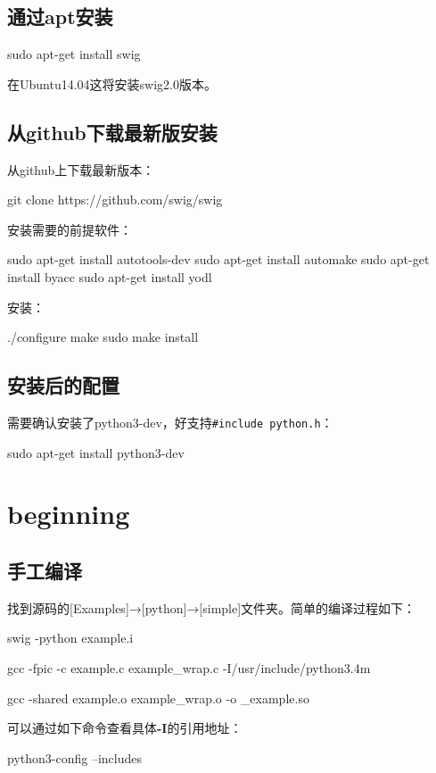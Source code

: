 \documentclass[12pt,oneside]{book}
\begin{document}
\begin{common-format}
\subsection{通过apt安装}
\begin{tcbbash}[]
sudo apt-get install swig
\end{tcbbash}

在Ubuntu14.04这将安装swig2.0版本。

\subsection{从github下载最新版安装}
从github上下载最新版本：
\begin{tcbbash}[]
git  clone  https://github.com/swig/swig
\end{tcbbash}

安装需要的前提软件：
\begin{tcbbash}[]
sudo apt-get install autotools-dev
sudo apt-get install automake
sudo apt-get install byacc
sudo apt-get install yodl
\end{tcbbash}

安装：
\begin{tcbbash}[]
./configure
make
sudo make install
\end{tcbbash}

\subsection{安装后的配置}
需要确认安装了python3-dev，好支持\verb+#include python.h+：
\begin{tcbbash}[]
sudo apt-get install python3-dev
\end{tcbbash}

\section{beginning}
\subsection{手工编译}
找到源码的[Examples]→[python]→[simple]文件夹。简单的编译过程如下：
\begin{tcbbash}[]
swig -python example.i

gcc -fpic -c example.c example_wrap.c -I/usr/include/python3.4m

gcc -shared example.o example_wrap.o -o _example.so
\end{tcbbash}

可以通过如下命令查看具体\textbf{-I}的引用地址：
\begin{tcbbash}[]
python3-config --includes
\end{tcbbash}


\end{common-format}
\end{document}
